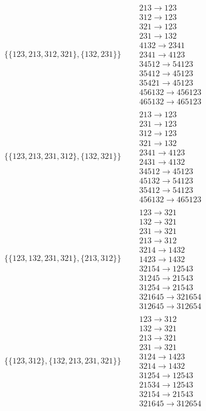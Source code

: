 \begin{tiny}
\begin{align}
\{\{123, 213, 312, 321\}, \{132, 231\}\}
\quad
&
\begin{matrix}
213 \to 123\\312 \to 123\\321 \to 123\\231 \to 132\\4132 \to 2341\\2341 \to 4123\\34512 \to 54123\\35412 \to 45123\\35421 \to 45123\\456132 \to 456123\\465132 \to 465123
\end{matrix}
\\
\{\{123, 213, 231, 312\}, \{132, 321\}\}
\quad
&
\begin{matrix}
213 \to 123\\231 \to 123\\312 \to 123\\321 \to 132\\2341 \to 4123\\2431 \to 4132\\34512 \to 45123\\45132 \to 54123\\35412 \to 54123\\456132 \to 465123
\end{matrix}
\\
\{\{123, 132, 231, 321\}, \{213, 312\}\}
\quad
&
\begin{matrix}
123 \to 321\\132 \to 321\\231 \to 321\\213 \to 312\\3214 \to 1432\\1423 \to 1432\\32154 \to 12543\\31245 \to 21543\\31254 \to 21543\\321645 \to 321654\\312645 \to 312654
\end{matrix}
\\
\{\{123, 312\}, \{132, 213, 231, 321\}\}
\quad
&
\begin{matrix}
123 \to 312\\132 \to 321\\213 \to 321\\231 \to 321\\3124 \to 1423\\3214 \to 1432\\31254 \to 12543\\21534 \to 12543\\32154 \to 21543\\321645 \to 312654

\end{matrix}
\end{align}
\end{tiny}
